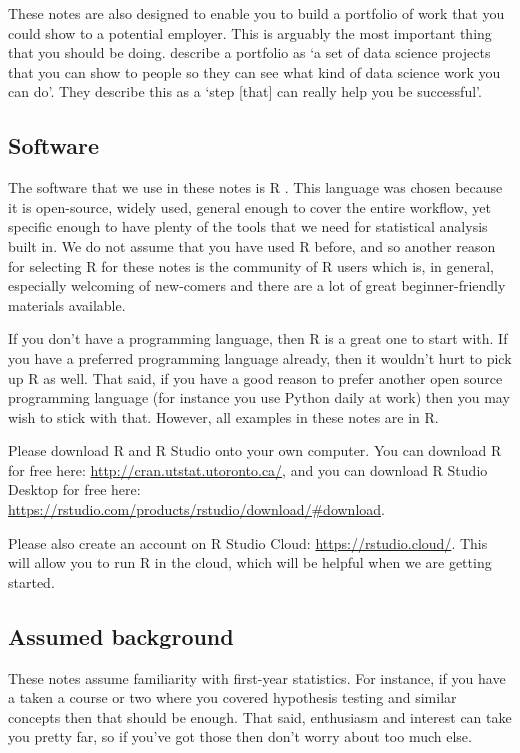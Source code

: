 \documentclass[
]{book}
\begin{document}
These notes are also designed to enable you to build a portfolio of work that you could show to a potential employer. This is arguably the most important thing that you should be doing. \citep[p.~55]{robinsonnolis2020} describe a portfolio as `a set of data science projects that you can show to people so they can see what kind of data science work you can do'. They describe this as a `step {[}that{]} can really help you be successful'.

\hypertarget{software}{%
\subsection{Software}\label{software}}

The software that we use in these notes is R \citep{citeR}. This language was chosen because it is open-source, widely used, general enough to cover the entire workflow, yet specific enough to have plenty of the tools that we need for statistical analysis built in. We do not assume that you have used R before, and so another reason for selecting R for these notes is the community of R users which is, in general, especially welcoming of new-comers and there are a lot of great beginner-friendly materials available.

If you don't have a programming language, then R is a great one to start with. If you have a preferred programming language already, then it wouldn't hurt to pick up R as well. That said, if you have a good reason to prefer another open source programming language (for instance you use Python daily at work) then you may wish to stick with that. However, all examples in these notes are in R.

Please download R and R Studio onto your own computer. You can download R for free here: \url{http://cran.utstat.utoronto.ca/}, and you can download R Studio Desktop for free here: \url{https://rstudio.com/products/rstudio/download/\#download}.

Please also create an account on R Studio Cloud: \url{https://rstudio.cloud/}. This will allow you to run R in the cloud, which will be helpful when we are getting started.

\hypertarget{assumed-background}{%
\subsection{Assumed background}\label{assumed-background}}

These notes assume familiarity with first-year statistics. For instance, if you have a taken a course or two where you covered hypothesis testing and similar concepts then that should be enough. That said, enthusiasm and interest can take you pretty far, so if you've got those then don't worry about too much else.
\end{document}

